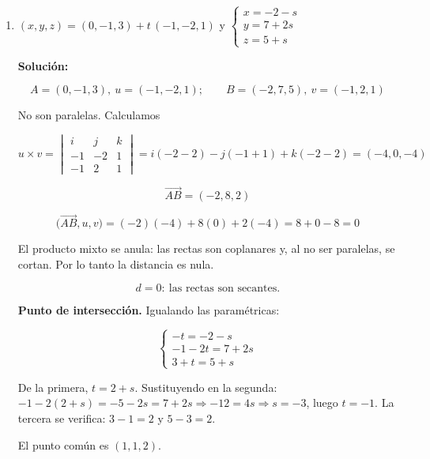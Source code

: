 \documentclass[12pt]{article}
\newcommand{\solucion}{%
    \vspace{0.8em}%
    \textbf{Solución:}%
    \vspace{0.8em}%
}
\begin{document}
\begin{enumerate}[label=\alph*.-]
    \[
    \overrightarrow{AB}=(1,2,-2)
    \]

    \[
    \big(\overrightarrow{AB},u,v\big)=\overrightarrow{AB}\cdot(u\times v)
    =1(-15)+2(-5)+(-2)(5)=-15-10-10=-35
    \]

    Como el producto mixto no es nulo, las rectas son alabeadas y

    \[
    \|u\times v\|=\sqrt{225+25+25}=\sqrt{275}=5\sqrt{11}
    \]

    \[
    d=\frac{|-35|}{5\sqrt{11}}=\frac{7}{\sqrt{11}}=\frac{7\sqrt{11}}{11}
    \]

    \[
    \boxed{d=\frac{7\sqrt{11}}{11}\approx2{,}11\ \text{u.l.}}
    \]

    \item $(x,y,z)=(0,-1,3)+t\,(-1,-2,1)$ \quad y \quad
    $\begin{cases} x=-2-s\\ y=7+2s\\ z=5+s \end{cases}$

    \solucion

    \[
    A=(0,-1,3),\ u=(-1,-2,1);\qquad B=(-2,7,5),\ v=(-1,2,1)
    \]

    No son paralelas. Calculamos

    \[
    u\times v=\begin{vmatrix}
    i & j & k\\
    -1 & -2 & 1\\
    -1 & 2 & 1
    \end{vmatrix}
    =i(-2-2)-j(-1+1)+k(-2-2)=(-4,0,-4)
    \]

    \[
    \overrightarrow{AB}=(-2,8,2)
    \]

    \[
    \big(\overrightarrow{AB},u,v\big)=(-2)(-4)+8(0)+2(-4)=8+0-8=0
    \]

    El producto mixto se anula: las rectas son coplanares y, al no ser
    paralelas, se cortan. Por lo tanto la distancia es nula.

    \[
    \boxed{d=0:\ \text{las rectas son secantes.}}
    \]

    \textbf{Punto de intersección.} Igualando las paramétricas:

    \[
    \begin{cases}
    -t=-2-s\\
    -1-2t=7+2s\\
    3+t=5+s
    \end{cases}
    \]

    De la primera, $t=2+s$. Sustituyendo en la segunda:
    $-1-2(2+s)=-5-2s=7+2s\Rightarrow -12=4s\Rightarrow s=-3$, luego $t=-1$.
    La tercera se verifica: $3-1=2$ y $5-3=2$. \checkmark

    El punto común es $(1,1,2)$.

\end{enumerate}
\end{document}
